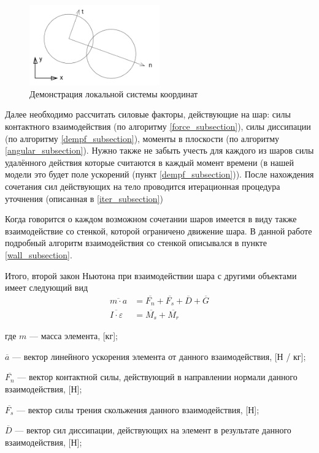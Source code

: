 \documentclass[utf8x, 14pt, oneside, a4paper]{article}
\begin{document}
\begin{figure}[H]
	\centering
	\includegraphics[width=0.5\textwidth]{local}
	\caption{Демонстрация локальной системы координат}
	\label{pic:local}
\end{figure} 

Далее необходимо рассчитать силовые факторы, действующие на шар: силы контактного взаимодействия (по алгоритму \ref{force_subsection}), силы диссипации (по алгоритму \ref{dempf_subsection}), моменты в плоскости (по алгоритму \ref{angular_subsection}). 
Нужно также не забыть учесть для каждого из шаров силы удалённого действия которые считаются в каждый момент времени (в нашей модели это будет поле ускорений (пункт \ref{dempf_subsection})). 
После нахождения сочетания сил действующих на тело проводится итерационная процедура уточнения (описанная в \ref{iter_subsection})

Когда говорится о каждом возможном сочетании шаров имеется в виду также взаимодействие со стенкой, которой ограничено движение шара. 
В данной работе подробный алгоритм взаимодействия со стенкой описывался в пункте \ref{wall_subsection}.

Итого, второй закон Ньютона при взаимодействии шара с другими объектами имеет следующий вид
\begin{align}
\overline{m \cdot a} &= \overline{F_n} + \overline{F_s} + \overline{D} + \overline{G}\\
\overline{I \cdot \varepsilon} &= \overline{M_s} + \overline{M_r}
\end{align}

где $m$ --- масса элемента, [кг];

$\overline{a}$ --- вектор линейного ускорения элемента от данного взаимодействия, [Н / кг];

$\overline{F_n}$ --- вектор контактной силы, действующий в направлении нормали данного взаимодействия, [Н];

$\overline{F_s}$ --- вектор силы трения скольжения данного взаимодействия, [Н];

$ \overline{D}$ --- вектор сил диссипации, действующих на элемент в результате данного взаимодействия, [Н];
\end{document}
